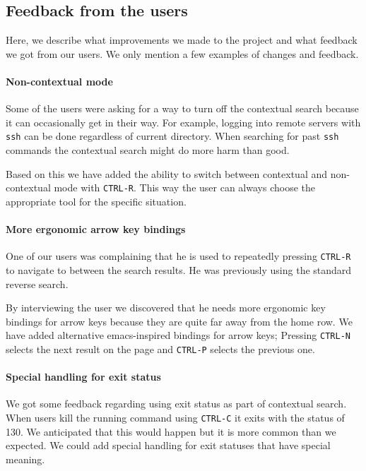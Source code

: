 \subsection{Feedback from the users}

Here, we describe what improvements we made to the project and what feedback we got from our users. We only mention a few examples of changes and feedback.

\paragraph{Non-contextual mode}

Some of the users were asking for a way to turn off the contextual search because it can occasionally get in their way. For example, logging into remote servers with \verb|ssh| can be done regardless of current directory. When searching for past \verb|ssh| commands the contextual search might do more harm than good.

Based on this we have added the ability to switch between contextual and non-contextual mode with \verb|CTRL-R|. This way the user can always choose the appropriate tool for the specific situation.


\paragraph{More ergonomic arrow key bindings}

One of our users was complaining that he is used to repeatedly pressing \verb|CTRL-R| to navigate to between the search results. He was previously using the standard reverse search.

By interviewing the user we discovered that he needs more ergonomic key bindings for arrow keys because they are quite far away from the home row. We have added alternative emacs-inspired bindings for arrow keys; Pressing \verb|CTRL-N| selects the next result on the page and \verb|CTRL-P| selects the previous one.   


\paragraph{Special handling for exit status}

We got some feedback regarding using exit status as part of contextual search. When users kill the running command using \verb|CTRL-C| it exits with the status of 130.
We anticipated that this would happen but it is more common than we expected.
We could add special handling for exit statuses that have special meaning.

